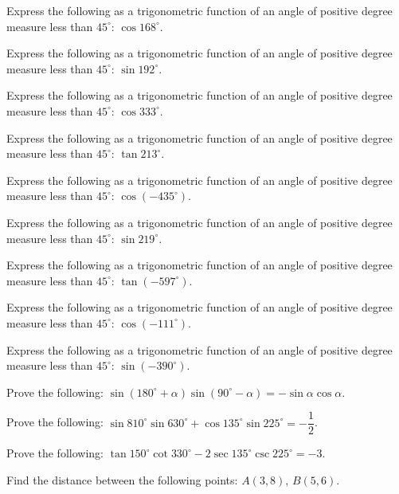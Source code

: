 \documentclass[11pt,a4paper]{article}
\begin{document}
\begin{shortlist}
\item Express the following as a trigonometric function of an angle of positive degree measure less than $45^\circ$: $\cos 168^\circ$.

\item Express the following as a trigonometric function of an angle of positive degree measure less than $45^\circ$: $\sin 192^\circ$.

\item Express the following as a trigonometric function of an angle of positive degree measure less than $45^\circ$: $\cos 333^\circ$.

\item Express the following as a trigonometric function of an angle of positive degree measure less than $45^\circ$: $\tan 213^\circ$.

\item Express the following as a trigonometric function of an angle of positive degree measure less than $45^\circ$: $\cos(-435^\circ)$.

\item Express the following as a trigonometric function of an angle of positive degree measure less than $45^\circ$: $\sin 219^\circ$.

\item Express the following as a trigonometric function of an angle of positive degree measure less than $45^\circ$: $\tan(-597^\circ)$.

\item Express the following as a trigonometric function of an angle of positive degree measure less than $45^\circ$: $\cos(-111^\circ)$.

\item Express the following as a trigonometric function of an angle of positive degree measure less than $45^\circ$: $\sin(-390^\circ)$.

\item Prove the following: $\sin(180^\circ+\alpha)\sin(90^\circ-\alpha)=-\sin\alpha\cos\alpha$.

\item Prove the following: $\sin 810^\circ\sin 630^\circ+\cos 135^\circ\sin 225^\circ=-\dfrac{1}{2}$.

\item Prove the following: $\tan 150^\circ\cot 330^\circ-2\sec 135^\circ\csc 225^\circ=-3$.

\item Find the distance between the following points: $A(3,8)$, $B(5,6)$.


\end{shortlist}
\end{document}
